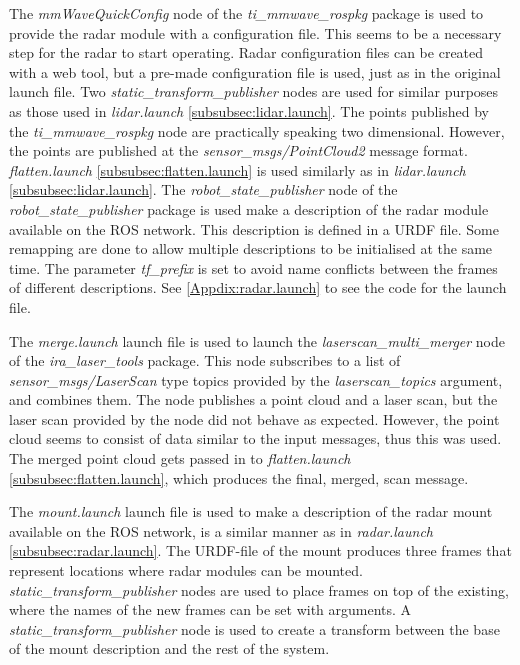 The \textit{mmWaveQuickConfig} node of the \textit{ti\_mmwave\_rospkg} package is used to provide the radar module with a configuration file. This seems to be a necessary step for the radar to start operating. Radar configuration files can be created with a web tool, but a pre-made configuration file is used, just as in the original launch file. Two \textit{static\_transform\_publisher} nodes are used for similar purposes as those used in \textit{lidar.launch} \ref{subsubsec:lidar.launch}. The points published by the \textit{ti\_mmwave\_rospkg} node are practically speaking two dimensional. However, the points are published at the \textit{sensor\_msgs/PointCloud2} message format. \textit{flatten.launch} \ref{subsubsec:flatten.launch} is used similarly as in \textit{lidar.launch} \ref{subsubsec:lidar.launch}. The \textit{robot\_state\_publisher} node of the \textit{robot\_state\_publisher} package is used make a description of the radar module available on the ROS network. This description is defined in a URDF file. Some remapping are done to allow multiple descriptions to be initialised at the same time. The parameter \textit{tf\_prefix} is set to avoid name conflicts between the frames of different descriptions. See \ref{Appdix:radar.launch} to see the code for the launch file.

\label{subsubsec:merge.launch}
The \textit{merge.launch} launch file is used to launch the \textit{laserscan\_multi\_merger} node of the \textit{ira\_laser\_tools} package. This node subscribes to a list of \textit{sensor\_msgs/LaserScan} type topics provided by the \textit{laserscan\_topics} argument, and combines them. The node publishes a point cloud and a laser scan, but the laser scan provided by the node did not behave as expected. However, the point cloud seems to consist of data similar to the input messages, thus this was used. The merged point cloud gets passed in to \textit{flatten.launch} \ref{subsubsec:flatten.launch}, which produces the final, merged, scan message.

\label{subsubsec:mount.launch}
The \textit{mount.launch} launch file is used to make a description of the radar mount available on the ROS network, is a similar manner as in \textit{radar.launch} \ref{subsubsec:radar.launch}. The URDF-file of the mount produces three frames that represent locations where radar modules can be mounted. \textit{static\_transform\_publisher} nodes are used to place frames on top of the existing, where the names of the new frames can be set with arguments. A \textit{static\_transform\_publisher} node is used to create a transform between the base of the mount description and the rest of the system.


